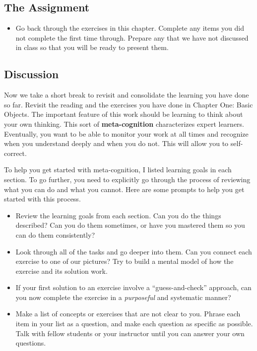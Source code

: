 \documentclass[10pt,]{book}
\newcommand{\terminology}[1]{\textbf{#1}}
\theoremstyle{plain}
\numberwithin{equation}{section}
\begin{document}
\subsection[The Assignment]{The Assignment}\label{subsection-17}
\begin{itemize}
\item{}
        Go back through the exercises in this chapter. Complete any items you
        did not complete the first time through. Prepare any that we have not
        discussed in class so that you will be ready to present them.
      \end{itemize}
\typeout{************************************************}
\typeout{************************************************}
\subsection[Discussion]{Discussion}\label{subsection-18}
Now we take a short break to revisit and consolidate the learning you
      have done so far. Revisit the reading and the exercises you have done in
      Chapter One: Basic Objects. The important feature of this work should be
      learning to think about your own thinking. This sort of \terminology{meta-cognition}
      characterizes expert learners. Eventually, you want to be able to monitor
      your work at all times and recognize when you understand deeply and when
      you do not. This will allow you to self-correct.
\par
To help you get started with meta-cognition, I listed learning goals in
      each section. To go further, you need to explicitly go through the process
      of reviewing what you can do and what you cannot. Here are some prompts to
      help you get started with this process.
      \begin{itemize}
\item{}
          Review the learning goals from each section. Can you do the things
          described? Can you do them sometimes, or have you mastered them so you
          can do them consistently?
        \item{}
          Look through all of the tasks and go deeper into them. Can you
          connect each exercise to one of our pictures? Try to build a mental
          model of how the exercise and its solution work.
        \item{}
          If your first solution to an exercise involve a ``guess-and-check''
          approach, can you now complete the exercise in a \emph{purposeful}
          and systematic manner?
        \item{}
          Make a list of concepts or exercises that are not clear to you. Phrase
          each item in your list as a question, and make each question as
          specific as possible. Talk with fellow students or your
          instructor until you can answer your own questions.
        \end{itemize}
\end{document}
